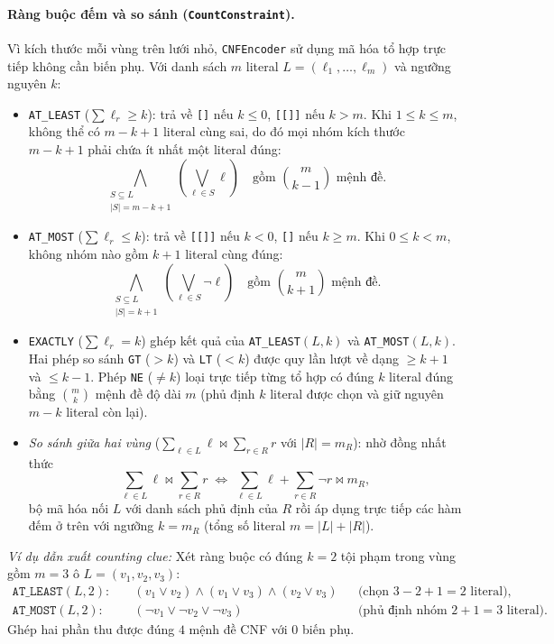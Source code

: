 \paragraph{Ràng buộc đếm và so sánh (\texttt{CountConstraint}).}
Vì kích thước mỗi vùng trên lưới nhỏ, \texttt{CNFEncoder} sử dụng mã hóa tổ hợp trực tiếp không cần biến phụ. Với danh sách $m$ literal $L = (\ell_1, \dots, \ell_m)$ và ngưỡng nguyên $k$:
\begin{itemize}
    \item \texttt{AT\_LEAST} ($\sum \ell_r \ge k$): trả về \texttt{[]} nếu $k \le 0$, \texttt{[[]]} nếu $k > m$. Khi $1 \le k \le m$, không thể có $m - k + 1$ literal cùng sai, do đó mọi nhóm kích thước $m - k + 1$ phải chứa ít nhất một literal đúng:
    \[
        \bigwedge_{\substack{S \subseteq L \\ |S| = m - k + 1}} \left( \bigvee_{\ell \in S} \ell \right) \quad \text{gồm } \binom{m}{k - 1} \text{ mệnh đề.}
    \]
    \item \texttt{AT\_MOST} ($\sum \ell_r \le k$): trả về \texttt{[[]]} nếu $k < 0$, \texttt{[]} nếu $k \ge m$. Khi $0 \le k < m$, không nhóm nào gồm $k + 1$ literal cùng đúng:
    \[
        \bigwedge_{\substack{S \subseteq L \\ |S| = k + 1}} \left( \bigvee_{\ell \in S} \neg \ell \right) \quad \text{gồm } \binom{m}{k + 1} \text{ mệnh đề.}
    \]
    \item \texttt{EXACTLY} ($\sum \ell_r = k$) ghép kết quả của \texttt{AT\_LEAST}$(L, k)$ và \texttt{AT\_MOST}$(L, k)$. Hai phép so sánh \texttt{GT} ($> k$) và \texttt{LT} ($< k$) được quy lần lượt về dạng $\ge k + 1$ và $\le k - 1$. Phép \texttt{NE} ($\neq k$) loại trực tiếp từng tổ hợp có đúng $k$ literal đúng bằng $\binom{m}{k}$ mệnh đề độ dài $m$ (phủ định $k$ literal được chọn và giữ nguyên $m - k$ literal còn lại).
    \item \emph{So sánh giữa hai vùng} ($\sum_{\ell \in L} \ell \bowtie \sum_{r \in R} r$ với $|R| = m_R$): nhờ đồng nhất thức
    \[
        \sum_{\ell \in L} \ell \bowtie \sum_{r \in R} r \;\iff\; \sum_{\ell \in L} \ell + \sum_{r \in R} \neg r \bowtie m_R,
    \]
    bộ mã hóa nối $L$ với danh sách phủ định của $R$ rồi áp dụng trực tiếp các hàm đếm ở trên với ngưỡng $k = m_R$ (tổng số literal $m = |L| + |R|$).
\end{itemize}

\emph{Ví dụ dẫn xuất counting clue:} Xét ràng buộc có đúng $k = 2$ tội phạm trong vùng gồm $m = 3$ ô $L = (v_1, v_2, v_3)$:
\begin{align*}
    \texttt{AT\_LEAST}(L, 2):\quad & (v_1 \lor v_2) \land (v_1 \lor v_3) \land (v_2 \lor v_3) && \text{(chọn } 3 - 2 + 1 = 2 \text{ literal),} \\
    \texttt{AT\_MOST}(L, 2):\quad & (\neg v_1 \lor \neg v_2 \lor \neg v_3) && \text{(phủ định nhóm } 2 + 1 = 3 \text{ literal).}
\end{align*}
Ghép hai phần thu được đúng $4$ mệnh đề CNF với $0$ biến phụ.

